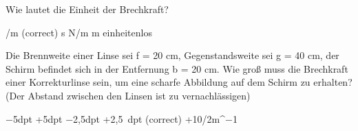 \documentclass[11pt]{exam}
\begin{document}
\begin{questions}
\vspace{3mm}\question Wie lautet die Einheit der Brechkraft?

\begin{choices}
	/m (correct)
	\choice s
	\choice N/m
	\choice m
	\choice einheitenlos
\end{choices}

\vspace{3mm}\question Die Brennweite einer Linse sei f = 20 cm, Gegenstandsweite sei g = 40 cm, der Schirm befindet sich in der Entfernung b = 20 cm. Wie groß muss die Brechkraft einer Korrekturlinse sein, um eine scharfe Abbildung auf dem Schirm zu erhalten? (Der Abstand zwischen den Linsen ist zu vernachlässigen)

\begin{choices}
	\choice −5dpt
	\choice +5dpt
	\choice −2,5dpt
	\choice +2,5 dpt (correct)
	\choice +10/2m^−1
\end{choices}

\vspace{3mm}\end{questions}
\end{document}
